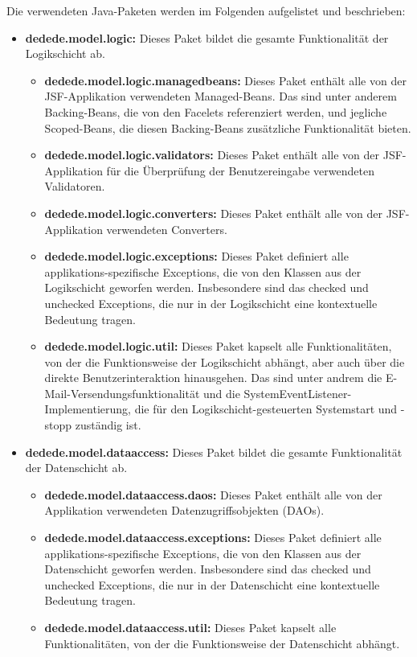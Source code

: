 \documentclass{article}
\begin{document}
Die verwendeten Java-Paketen werden im Folgenden aufgelistet und beschrieben:
\begin{itemize}
	\item \textbf{dedede.model.logic:} Dieses Paket bildet die gesamte Funktionalität der Logikschicht ab.
		\begin{itemize}
			\item \textbf{dedede.model.logic.managedbeans:} Dieses Paket enthält alle von der JSF-Applikation verwendeten Managed-Beans.
				Das sind unter anderem Backing-Beans, die von den Facelets referenziert werden, und jegliche Scoped-Beans, die diesen Backing-Beans zusätzliche Funktionalität bieten.
			\item \textbf{dedede.model.logic.validators:} Dieses Paket enthält alle von der JSF-Applikation für die Überprüfung der Benutzereingabe verwendeten Validatoren.
			\item \textbf{dedede.model.logic.converters:} Dieses Paket enthält alle von der JSF-Applikation verwendeten Converters.
			\item \textbf{dedede.model.logic.exceptions:} Dieses Paket definiert alle applikations-spezifische Exceptions, die von den Klassen aus der Logikschicht geworfen werden.
				Insbesondere sind das checked und unchecked Exceptions, die nur in der Logikschicht eine kontextuelle Bedeutung tragen.
			\item \textbf{dedede.model.logic.util:} Dieses Paket kapselt alle Funktionalitäten, von der die Funktionsweise der Logikschicht abhängt, aber auch über die direkte Benutzerinteraktion hinausgehen.
				Das sind unter andrem die E-Mail-Versendungsfunktionalität und die SystemEventListener-Implementierung, die für den Logikschicht-gesteuerten Systemstart und -stopp zuständig ist.
		\end{itemize}
	\item \textbf{dedede.model.dataaccess:} Dieses Paket bildet die gesamte Funktionalität der Datenschicht ab.
		\begin{itemize}
			\item \textbf{dedede.model.dataaccess.daos:} Dieses Paket enthält alle von der Applikation verwendeten Datenzugriffsobjekten (DAOs).
			\item \textbf{dedede.model.dataaccess.exceptions:} Dieses Paket definiert alle applikations-spezifische Exceptions, die von den Klassen aus der Datenschicht geworfen werden.
				Insbesondere sind das checked und unchecked Exceptions, die nur in der Datenschicht eine kontextuelle Bedeutung tragen.
			\item \textbf{dedede.model.dataaccess.util:} Dieses Paket kapselt alle Funktionalitäten, von der die Funktionsweise der Datenschicht abhängt.

\end{itemize}
\end{itemize}
\end{document}
